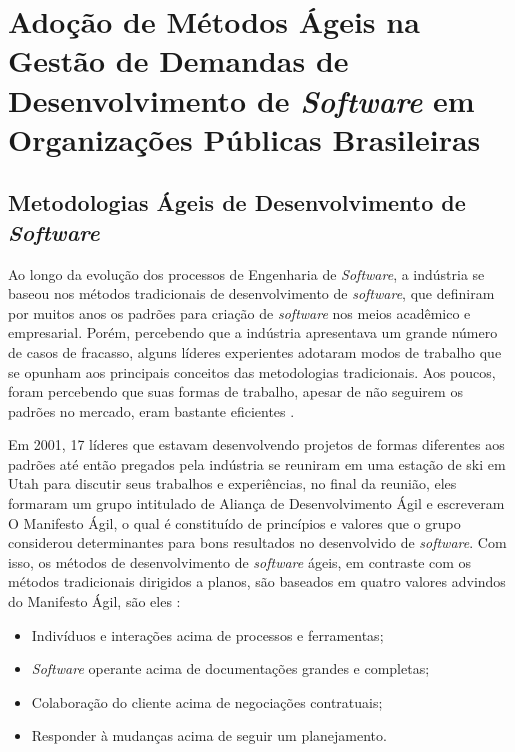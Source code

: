 

\chapter[Adoção de Métodos Ágeis na Gestão de Demandas de Desenvolvimento de \textit{Software} em Organizações Públicas Brasileiras]{Adoção de Métodos Ágeis na Gestão de Demandas de Desenvolvimento de \textit{Software} em Organizações Públicas Brasileiras}

\section[Metodologias Ágeis de Desenvolvimento de \textit{Software}]{Metodologias Ágeis de Desenvolvimento de \textit{Software}}

Ao longo da evolução dos processos de Engenharia de \textit{Software}, a indústria se baseou nos métodos tradicionais de desenvolvimento de \textit{software}, que definiram por muitos anos os padrões para criação de \textit{software} nos meios acadêmico e empresarial. Porém, percebendo que a indústria apresentava um grande número de casos de fracasso, alguns líderes experientes adotaram modos de trabalho que se opunham aos principais conceitos das metodologias tradicionais. Aos poucos, foram percebendo que suas formas de trabalho, apesar de não seguirem os padrões no mercado, eram bastante eficientes   \cite{filho}. 

Em 2001, 17 líderes que estavam desenvolvendo projetos de formas diferentes aos padrões até então pregados pela indústria se reuniram em uma estação de ski em Utah para discutir seus trabalhos e experiências, no final da reunião, eles formaram um grupo intitulado de Aliança de Desenvolvimento Ágil e escreveram O Manifesto Ágil, o qual é constituído de princípios e valores que o grupo considerou determinantes para bons resultados no desenvolvido de \textit{software}. Com isso, os métodos de desenvolvimento de \textit{software} ágeis, em contraste com os métodos tradicionais dirigidos a planos, são baseados em quatro valores advindos do Manifesto Ágil, são eles \cite{manifesto}:
\begin{itemize}
\item Indivíduos e interações acima de processos e ferramentas;
\item \textit{Software} operante acima de documentações grandes e completas;
\item Colaboração do cliente acima de negociações contratuais;
\item Responder à mudanças acima de seguir um planejamento.
\end{itemize}

